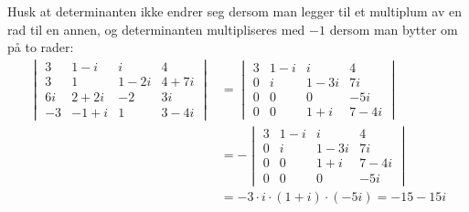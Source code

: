 \documentclass[notitlepage,a4paper,12pt,norsk]{IMFeksamen}
\newcommand{\0}{\V{0}}
\newcommand{\oppgslutt}{
\begin{center}
\pgfornament[width=6cm]{88}
\end{center}
}
\newenvironment{losning}{\begin{oppgave}}{\oppgslutt\end{oppgave}}
\begin{document}
\begin{losning}
Husk at determinanten ikke endrer seg dersom man legger til et
multiplum av en rad til en annen, og determinanten multipliseres med
$-1$ dersom man bytter om på to rader:
\begin{align*}
\begin{vmatrix}
3  &  1 - i  & i      & 4      \\
3  &  1      & 1 - 2i & 4 + 7i \\
6i &  2 + 2i & -2     & 3i     \\
-3 & -1 + i  & 1      & 3 - 4i
\end{vmatrix}
&=
\begin{vmatrix}
3 &  1 - i  & i      & 4  \\
0 &  i      & 1 - 3i & 7i \\
0 &  0      & 0      & -5i\\
0 &  0      & 1+i    & 7 - 4i
\end{vmatrix}
\\
&=
-\begin{vmatrix}
3 &  1 - i  & i      & 4     \\
0 &  i      & 1 - 3i & 7i    \\
0 &  0      & 1+i    & 7 - 4i\\
0 &  0      & 0      & -5i
\end{vmatrix}
\\
&= - 3 \cdot i \cdot (1+i) \cdot (-5i)
 = -15-15i
\end{align*}
\end{losning}
\end{document}
